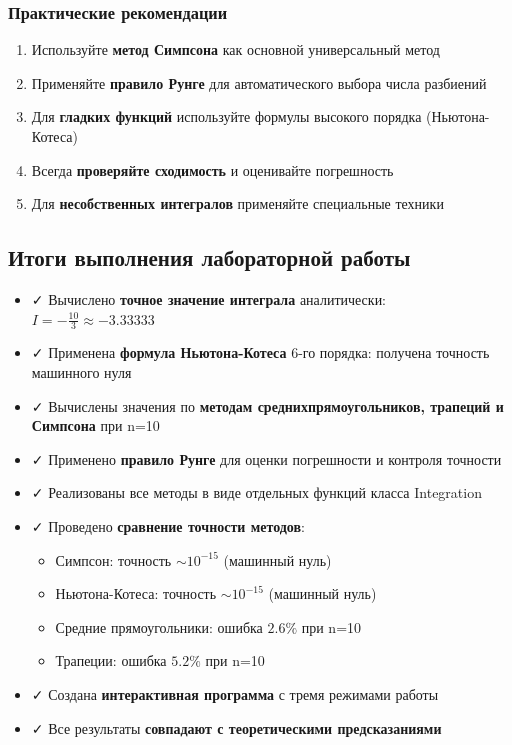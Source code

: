 \documentclass[a4paper,12pt]{article}
\begin{document}
\subsubsection*{Практические рекомендации}

\begin{enumerate}
    \item Используйте \textbf{метод Симпсона} как основной универсальный метод

    \item Применяйте \textbf{правило Рунге} для автоматического выбора числа разбиений

    \item Для \textbf{гладких функций} используйте формулы высокого порядка (Ньютона-Котеса)

    \item Всегда \textbf{проверяйте сходимость} и оценивайте погрешность

    \item Для \textbf{несобственных интегралов} применяйте специальные техники
\end{enumerate}

\subsection{Итоги выполнения лабораторной работы}

\begin{itemize}
    \item ✓ Вычислено \textbf{точное значение интеграла} аналитически: $I = -\frac{10}{3} \approx -3.33333$

    \item ✓ Применена \textbf{формула Ньютона-Котеса} 6-го порядка: получена точность машинного нуля

    \item ✓ Вычислены значения по \textbf{методам среднихпрямоугольников, трапеций и Симпсона} при n=10

    \item ✓ Применено \textbf{правило Рунге} для оценки погрешности и контроля точности

    \item ✓ Реализованы все методы в виде отдельных функций класса Integration

    \item ✓ Проведено \textbf{сравнение точности методов}:
    \begin{itemize}
        \item Симпсон: точность $\sim 10^{-15}$ (машинный нуль)
        \item Ньютона-Котеса: точность $\sim 10^{-15}$ (машинный нуль)
        \item Средние прямоугольники: ошибка $2.6\%$ при n=10
        \item Трапеции: ошибка $5.2\%$ при n=10
    \end{itemize}

    \item ✓ Создана \textbf{интерактивная программа} с тремя режимами работы

    \item ✓ Все результаты \textbf{совпадают с теоретическими предсказаниями}
\end{itemize}
\end{document}
